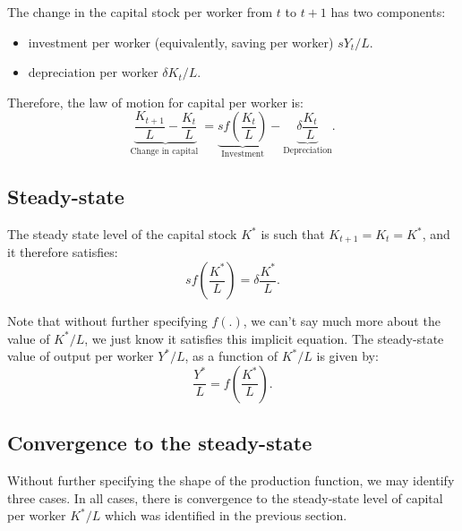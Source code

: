 \documentclass[]{book}
\providecommand{\tightlist}{%
  \setlength{\itemsep}{0pt}\setlength{\parskip}{0pt}}
\begin{document}
The change in the capital stock per worker from \(t\) to \(t+1\) has two
components:

\begin{itemize}
\tightlist
\item
  investment per worker (equivalently, saving per worker) \(s Y_t / L\).
\item
  depreciation per worker \(\delta K_t / L\).
\end{itemize}

Therefore, the law of motion for capital per worker is:
\[\underbrace{\frac{K_{t+1}}{L}-\frac{K_{t}}{L}}_{\text{Change in capital }}=\underbrace{sf\left(\frac{K_{t}}{L}\right)}_{\text{Investment}}-\underbrace{\delta\frac{K_{t}}{L}}_{\text{Depreciation}}.\]

\subsection{Steady-state}\label{steady-state}

The steady state level of the capital stock \(K^{*}\) is such that
\(K_{t+1}=K_{t}=K^{*}\), and it therefore satisfies:
\[\boxed{sf\left(\frac{K^{*}}{L}\right)=\delta\frac{K^{*}}{L}}.\]

Note that without further specifying \(f(.)\), we can't say much more
about the value of \(K^{*}/L\), we just know it satisfies this implicit
equation. The steady-state value of output per worker \(Y^{*}/L\), as a
function of \(K^{*}/L\) is given by:
\[\frac{Y^{*}}{L}=f\left(\frac{K^{*}}{L}\right).\]

\subsection{Convergence to the
steady-state}\label{convergence-to-the-steady-state}

Without further specifying the shape of the production function, we may
identify three cases. In all cases, there is convergence to the
steady-state level of capital per worker \(K^{*}/L\) which was
identified in the previous section.
\end{document}
